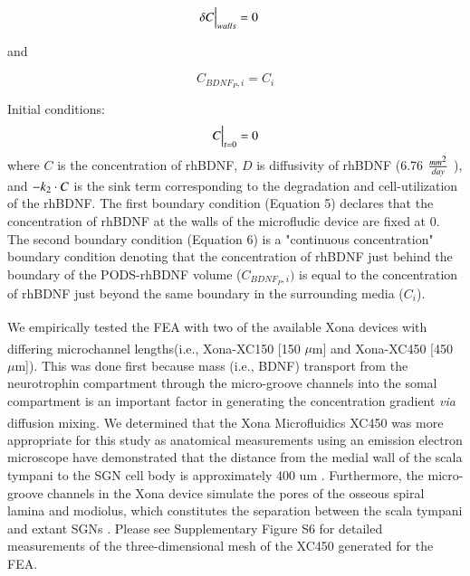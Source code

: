 \documentclass[review]{elsarticle}
\begin{document}
\begin{equation}
\delta C \Big{|}_{walls}= 0\quad 
\end{equation}

\begin{center}
and
\end{center}

\begin{equation}
	C_{BDNF_{P},i} = C_{i}
\end{equation}

Initial conditions: 
\begin{equation}
C\Big{|}_{t=0} = 0
\end{equation}
where $C$ is the concentration of rhBDNF, $D$ is diffusivity of rhBDNF (6.76 $\frac{mm\textsuperscript{2}}{day} $ \cite{Stroh2004}), and $-k\textsubscript{2}\cdot C$ is the sink term corresponding to the degradation and cell-utilization of the rhBDNF. The first boundary condition (Equation 5) declares that the concentration of rhBDNF at the walls of the microfludic device are fixed at 0. The second boundary condition (Equation 6) is a "continuous concentration" boundary condition denoting that the concentration of rhBDNF just behind the boundary of the PODS-rhBDNF volume ($C_{BDNF_P,i})$ is equal to the concentration of rhBDNF just beyond the same boundary in the surrounding media ($C_i$).

\indent We empirically tested the FEA with two of the available Xona\textsuperscript{\texttrademark} devices with differing microchannel lengths\textemdash (i.e., Xona\textsuperscript{\texttrademark}-XC150 [150 $\mu$m] and Xona\textsuperscript{\texttrademark}-XC450 [450 $\mu$m]). This was done first because mass (i.e., BDNF) transport from the neurotrophin compartment through the micro-groove channels into the somal compartment is an important factor in generating the concentration gradient \textit{via} diffusion mixing.  We determined that the Xona\textsuperscript{\texttrademark} Microfluidics XC450 was more appropriate for this study as anatomical measurements using an emission electron microscope have demonstrated that the distance from the medial wall of the scala tympani to the SGN cell body is approximately 400 um \cite{Rask-Andersen2012a}. Furthermore, the micro-groove channels in the Xona device simulate the pores of the osseous spiral lamina and modiolus, which constitutes the separation between the scala tympani and extant SGNs  \cite{Tuncel2005,Kucuk1991a}.  Please see Supplementary Figure S6 for detailed measurements of the three-dimensional mesh of the XC450 generated for the FEA. 
\end{document}
